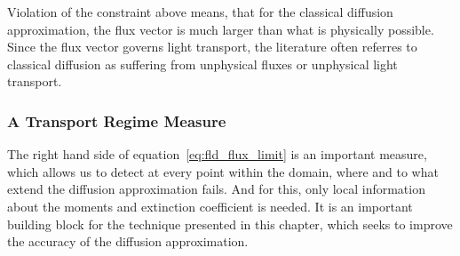 
Violation of the constraint above means, that for the classical diffusion approximation, the flux vector is much larger than what is physically possible. Since the flux vector governs light transport, the literature often referres to classical diffusion as suffering from unphysical fluxes or unphysical light transport.


\subsubsection*{A Transport Regime Measure}

The right hand side of equation~\ref{eq:fld_flux_limit} is an important measure, which allows us to detect at every point within the domain, where and to what extend the diffusion approximation fails. And for this, only local information about the moments and extinction coefficient is needed. It is an important building block for the technique presented in this chapter, which seeks to improve the accuracy of the diffusion approximation.


